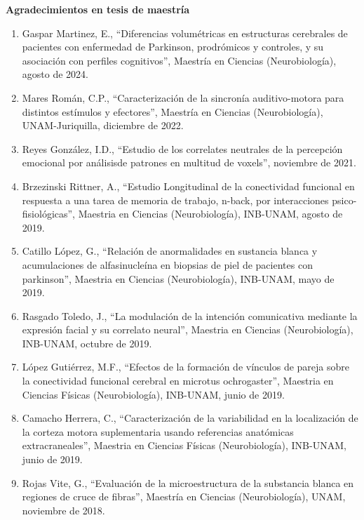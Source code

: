 {\large \textbf{Agradecimientos en tesis de maestría}}

\hrulefill

\begin{enumerate}

\item Gaspar Martinez, E., “Diferencias volumétricas en estructuras cerebrales de pacientes con enfermedad de Parkinson, prodrómicos y 
controles, y 
su asociación con perfiles cognitivos”, Maestría en Ciencias (Neurobiología), agosto de 2024.

\item Mares Román, C.P., “Caracterización de la sincronía auditivo-motora para distintos estímulos y efectores”, Maestría en Ciencias 
(Neurobiología), UNAM-Juriquilla, diciembre de 2022.

\item Reyes González, I.D., “Estudio de los correlates neutrales de la percepción emocional por análisisde patrones en multitud de voxels”, 
noviembre de 2021.

\item Brzezinski Rittner, A., “Estudio Longitudinal de la conectividad funcional en respuesta a una tarea de memoria de trabajo, n-back, por 
interacciones psico-fisiológicas”, Maestria en Ciencias (Neurobiología), INB-UNAM, agosto de 2019.

\item Catillo López, G., “Relación de anormalidades en sustancia blanca y acumulaciones de alfasinucleína en biopsias de piel de pacientes 
con 
parkinson”, Maestria en Ciencias (Neurobiología), INB-UNAM, mayo de 2019.

\item Rasgado Toledo, J., “La modulación de la intención comunicativa mediante la expresión facial y su correlato neural”, Maestria en 
Ciencias 
(Neurobiología), INB-UNAM, octubre de 2019.

\item López Gutiérrez, M.F., “Efectos de la formación de vínculos de pareja sobre la conectividad funcional cerebral en microtus 
ochrogaster”, 
Maestria en Ciencias Físicas (Neurobiología), INB-UNAM, junio de 2019.

\item Camacho Herrera, C., “Caracterización de la variabilidad en la localización de la corteza motora suplementaria usando referencias 
anatómicas 
extracraneales”, Maestria en Ciencias Físicas (Neurobiología), INB-UNAM, junio de 2019.

\item Rojas Vite, G., “Evaluación de la microestructura de la substancia blanca en regiones de cruce de fibras”, Maestría en Ciencias 
(Neurobiología), UNAM, noviembre de 2018.


\end{enumerate}
